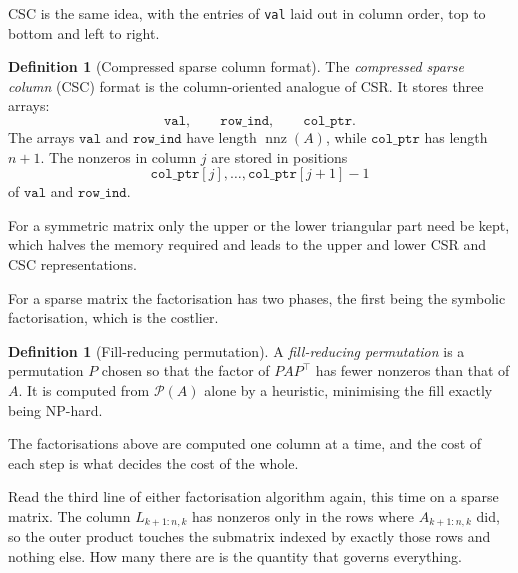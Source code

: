 \documentclass[a4paper,11pt]{book}
\theoremstyle{plain}
\theoremstyle{definition}
\newtheorem{definition}[theorem]{Definition}
\theoremstyle{remark}
\numberwithin{equation}{chapter}
\numberwithin{algorithm}{chapter}
\begin{document}
	CSC is the same idea, with the entries of \texttt{val} laid out in column
	order, top to bottom and left to right.
	\begin{definition}[Compressed sparse column format]
		The \emph{compressed sparse column} (CSC) format is the column-oriented
		analogue of CSR. It stores three arrays:
		\[
		\texttt{val},\qquad \texttt{row\_ind},\qquad \texttt{col\_ptr}.
		\]
		The arrays $\texttt{val}$ and $\texttt{row\_ind}$ have length
		$\operatorname{nnz}(A)$, while $\texttt{col\_ptr}$ has length $n+1$. The
		nonzeros in column $j$ are stored in positions
		\[
		\texttt{col\_ptr}[j],\dots,\texttt{col\_ptr}[j+1]-1
		\]
		of $\texttt{val}$ and $\texttt{row\_ind}$.
	\end{definition}
	
	For a symmetric matrix only the upper or the lower triangular part need be
	kept, which halves the memory required and leads to the upper and lower CSR and
	CSC representations.
	
	
	
	For a sparse matrix the factorisation has two phases, the first being the
	symbolic factorisation, which is the costlier.
	
	\begin{definition}[Fill-reducing permutation]
		A \emph{fill-reducing permutation} is a permutation $P$ chosen so that the
		factor of $PAP^\top$ has fewer nonzeros than that of $A$. It is computed from
		$\mathcal{P}(A)$ alone by a heuristic, minimising the fill exactly being
		NP-hard.
	\end{definition}
	
	The factorisations above are computed one column at a time, and the cost of
	each step is what decides the cost of the whole.

	Read the third line of either factorisation algorithm again, this time on a
	sparse matrix. The column $L_{k+1:n,k}$ has nonzeros only in the rows where
	$A_{k+1:n,k}$ did, so the outer product touches the submatrix indexed by
	exactly those rows and nothing else. How many there are is the quantity that
	governs everything.
\end{document}
